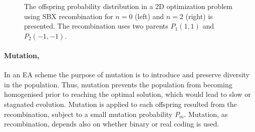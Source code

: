 \begin{itemize}
\begin{figure}[h!]
\begin{minipage}[b]{0.5\linewidth}
 \centering
\end{minipage}
\begin{minipage}[b]{0.5\linewidth}
 \centering
\end{minipage}
\caption{The offspring probability distribution in a 2D optimization problem using SBX recombination for $n=0$ (left) and $n=2$ (right) is presented. The recombination uses two parents $P_1(1,1)$ and $P_2(-1,-1)$.}
\label{sbx2}
\end{figure}
\end{itemize}
  
\paragraph{Mutation,}
In an EA scheme the purpose of mutation is to introduce and preserve diversity in the population. Thus, mutation prevents the population from becoming homogenised prior to reaching the optimal solution, which would lead to slow or stagnated evolution. Mutation is applied to each offspring resulted from the recombination, subject to a small mutation probability $P_m$. Mutation, as recombination, depends also on whether binary or real coding is used.


